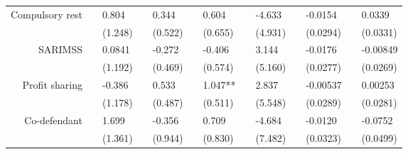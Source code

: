 \begin{tabular}{rrrrrrrrrrrrr}
Compulsory rest & \multicolumn{1}{l}{} & \multicolumn{1}{l}{0.804} & \multicolumn{1}{l}{} & \multicolumn{1}{l}{0.344} & \multicolumn{1}{l}{} & \multicolumn{1}{l}{0.604} & \multicolumn{1}{l}{} & \multicolumn{1}{l}{-4.633} & \multicolumn{1}{l}{} & \multicolumn{1}{l}{-0.0154} & \multicolumn{1}{l}{} & \multicolumn{1}{l}{0.0339} \\
      & \multicolumn{1}{l}{} & \multicolumn{1}{l}{(1.248)} & \multicolumn{1}{l}{} & \multicolumn{1}{l}{(0.522)} & \multicolumn{1}{l}{} & \multicolumn{1}{l}{(0.655)} & \multicolumn{1}{l}{} & \multicolumn{1}{l}{(4.931)} & \multicolumn{1}{l}{} & \multicolumn{1}{l}{(0.0294)} & \multicolumn{1}{l}{} & \multicolumn{1}{l}{(0.0331)} \\
SARIMSS & \multicolumn{1}{l}{} & \multicolumn{1}{l}{0.0841} & \multicolumn{1}{l}{} & \multicolumn{1}{l}{-0.272} & \multicolumn{1}{l}{} & \multicolumn{1}{l}{-0.406} & \multicolumn{1}{l}{} & \multicolumn{1}{l}{3.144} & \multicolumn{1}{l}{} & \multicolumn{1}{l}{-0.0176} & \multicolumn{1}{l}{} & \multicolumn{1}{l}{-0.00849} \\
      & \multicolumn{1}{l}{} & \multicolumn{1}{l}{(1.192)} & \multicolumn{1}{l}{} & \multicolumn{1}{l}{(0.469)} & \multicolumn{1}{l}{} & \multicolumn{1}{l}{(0.574)} & \multicolumn{1}{l}{} & \multicolumn{1}{l}{(5.160)} & \multicolumn{1}{l}{} & \multicolumn{1}{l}{(0.0277)} & \multicolumn{1}{l}{} & \multicolumn{1}{l}{(0.0269)} \\
Profit sharing & \multicolumn{1}{l}{} & \multicolumn{1}{l}{-0.386} & \multicolumn{1}{l}{} & \multicolumn{1}{l}{0.533} & \multicolumn{1}{l}{} & \multicolumn{1}{l}{1.047**} & \multicolumn{1}{l}{} & \multicolumn{1}{l}{2.837} & \multicolumn{1}{l}{} & \multicolumn{1}{l}{-0.00537} & \multicolumn{1}{l}{} & \multicolumn{1}{l}{0.00253} \\
      & \multicolumn{1}{l}{} & \multicolumn{1}{l}{(1.178)} & \multicolumn{1}{l}{} & \multicolumn{1}{l}{(0.487)} & \multicolumn{1}{l}{} & \multicolumn{1}{l}{(0.511)} & \multicolumn{1}{l}{} & \multicolumn{1}{l}{(5.548)} & \multicolumn{1}{l}{} & \multicolumn{1}{l}{(0.0289)} & \multicolumn{1}{l}{} & \multicolumn{1}{l}{(0.0281)} \\
Co-defendant & \multicolumn{1}{l}{} & \multicolumn{1}{l}{1.699} & \multicolumn{1}{l}{} & \multicolumn{1}{l}{-0.356} & \multicolumn{1}{l}{} & \multicolumn{1}{l}{0.709} & \multicolumn{1}{l}{} & \multicolumn{1}{l}{-4.684} & \multicolumn{1}{l}{} & \multicolumn{1}{l}{-0.0120} & \multicolumn{1}{l}{} & \multicolumn{1}{l}{-0.0752} \\
      & \multicolumn{1}{l}{} & \multicolumn{1}{l}{(1.361)} & \multicolumn{1}{l}{} & \multicolumn{1}{l}{(0.944)} & \multicolumn{1}{l}{} & \multicolumn{1}{l}{(0.830)} & \multicolumn{1}{l}{} & \multicolumn{1}{l}{(7.482)} & \multicolumn{1}{l}{} & \multicolumn{1}{l}{(0.0323)} & \multicolumn{1}{l}{} & \multicolumn{1}{l}{(0.0499)} \\

\end{tabular}
